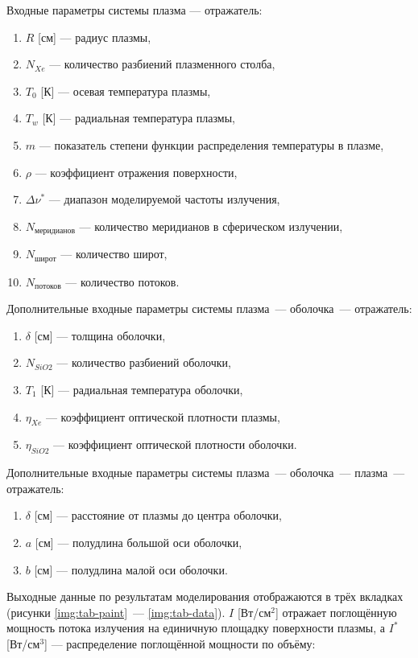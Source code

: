 Входные параметры системы плазма — отражатель:
\begin{enumerate}
	\item $R$ [см] — радиус плазмы,
	\item $N_{Xe}$ — количество разбиений плазменного столба,
	\item $T_0$ [К] — осевая температура плазмы,
	\item $T_w$ [К] — радиальная температура плазмы,
	\item $m$ — показатель степени функции распределения температуры в плазме,
	\item $\rho$ — коэффициент отражения поверхности,
	\item $\Delta\nu^*$ — диапазон моделируемой частоты излучения,
	\item $N_{\text{меридианов}}$ — количество меридианов в сферическом излучении,
	\item $N_{\text{широт}}$ — количество широт,
	\item $N_{\text{потоков}}$ — количество потоков.
\end{enumerate}

Дополнительные входные параметры системы плазма~— оболочка~— отражатель:
\begin{enumerate}
	\item $\delta$ [см] — толщина оболочки,
	\item $N_{SiO2}$ — количество разбиений оболочки,
	\item $T_1$ [К] — радиальная температура оболочки,
	\item $\eta_{Xe}$ — коэффициент оптической плотности плазмы,
	\item $\eta_{SiO2}$ — коэффициент оптической плотности оболочки.
\end{enumerate}

Дополнительные входные параметры системы плазма~— оболочка~— плазма~— отражатель:
\begin{enumerate}
	\item $\delta$ [см] — расстояние от плазмы до центра оболочки,
	\item $a$ [см] — полудлина большой оси оболочки,
	\item $b$ [см] — полудлина малой оси оболочки.
\end{enumerate}

Выходные данные по результатам моделирования отображаются в трёх вкладках (рисунки \ref{img:tab-paint}~— \ref{img:tab-data}). $I$ [Вт/см$^2$] отражает поглощённую мощность потока излучения на единичную площадку поверхности плазмы, а $I^*$ [Вт/см$^3$] — распределение поглощённой мощности по объёму:

